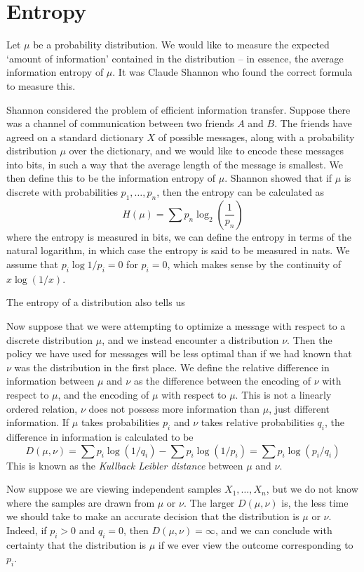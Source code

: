 \chapter{Entropy}

Let $\mu$ be a probability distribution. We would like to measure the expected `amount of information' contained in the distribution -- in essence, the average information entropy of $\mu$. It was Claude Shannon who found the correct formula to measure this.

Shannon considered the problem of efficient information transfer. Suppose there was a channel of communication between two friends $A$ and $B$. The friends have agreed on a standard dictionary $X$ of possible messages, along with a probability distribution $\mu$ over the dictionary, and we would like to encode these messages into bits, in such a way that the average length of the message is smallest. We then define this to be the information entropy of $\mu$. Shannon showed that if $\mu$ is discrete with probabilities $p_1, \dots, p_n$, then the entropy can be calculated as
%
\[ H(\mu) = \sum p_n \log_2 \left( \frac{1}{p_n} \right) \]
%
where the entropy is measured in bits, we can define the entropy in terms of the natural logarithm, in which case the entropy is said to be measured in nats. We assume that $p_i \log 1/p_i = 0$ for $p_i = 0$, which makes sense by the continuity of $x \log (1/x)$.

The entropy of a distribution also tells us 

Now suppose that we were attempting to optimize a message with respect to a discrete distribution $\mu$, and we instead encounter a distribution $\nu$. Then the policy we have used for messages will be less optimal than if we had known that $\nu$ was the distribution in the first place. We define the relative difference in information between $\mu$ and $\nu$ as the difference between the encoding of $\nu$ with respect to $\mu$, and the encoding of $\mu$ with respect to $\mu$. This is not a linearly ordered relation, $\nu$ does not possess more information than $\mu$, just different information. If $\mu$ takes probabilities $p_i$ and $\nu$ takes relative probabilities $q_i$, the difference in information is calculated to be
%
\[ D(\mu, \nu) = \sum p_i \log(1/q_i) - \sum p_i \log(1/p_i) = \sum p_i \log(p_i/q_i) \]
%
This is known as the \emph{Kullback Leibler distance} between $\mu$ and $\nu$.

Now suppose we are viewing independent samples $X_1, \dots, X_n$, but we do not know where the samples are drawn from $\mu$ or $\nu$. The larger $D(\mu, \nu)$ is, the less time we should take to make an accurate decision that the distribution is $\mu$ or $\nu$. Indeed, if $p_i > 0$ and $q_i = 0$, then $D(\mu, \nu) = \infty$, and we can conclude with certainty that the distribution is $\mu$ if we ever view the outcome corresponding to $p_i$.

